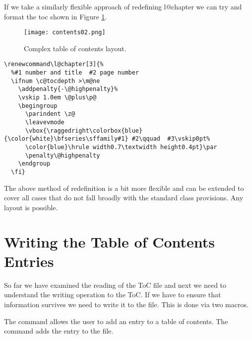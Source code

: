 If we take a similarly flexible approach of redefining l@chapter we can try and format the toc shown in Figure \ref{fig:tocsteward}.

\begin{figure}[tp]
\centering

\texttt{[image: contents02.png]}
\caption{Complex table of contents layout.}
\label{fig:tocsteward}
\end{figure}



\begin{lstlisting}
\renewcommand\l@chapter[3]{%
  %#1 number and title  #2 page number
  \ifnum \c@tocdepth >\m@ne
    \addpenalty{-\@highpenalty}%
    \vskip 1.0em \@plus\p@
    \begingroup
      \parindent \z@
      \leavevmode
      \vbox{\raggedright\colorbox{blue}{\color{white}\bfseries\sffamily#1} #2\qquad  #3\vskip0pt%
      \color{blue}\hrule width0.7\textwidth height0.4pt}\par
      \penalty\@highpenalty
    \endgroup
  \fi}
\end{lstlisting}




The above method of redefinition is a bit more flexible and can be extended to cover all cases that do not fall broadly with the standard class provisions. Any layout is possible.


\section{Writing the Table of Contents Entries}

So far we have examined the reading of the ToC file and next we need to understand the writing operation
to the ToC. If we have to ensure that information survives we need to write it to the file. This is done via two macros.


\begin{macro}{\addcontentsline}
The  command allows the user to add an entry to a table of contents. The command adds the entry
 to the  file.
\end{macro}


\begin{teX}       
 \long{}
\end{teX}

\begin{teX}
\def\addcontentsline#1#2#3{%
  \addtocontents{#1}{\protect\contentsline{#2}{#3}{\thepage}}}

\def\contentsline#1{\csname l@#1\endcsname}
\end{teX}



